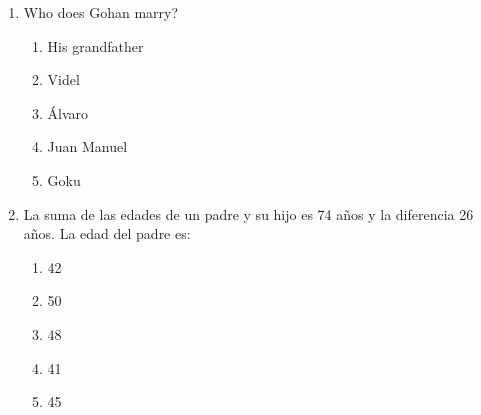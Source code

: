 \documentclass[letterpaper,addpoints,answers,twocolumn,10pt]{exam}
\begin{document}
\begin{enumerate}[leftmargin=.2in]
\begin{enumerate}[noitemsep,leftmargin=0in]
\end{enumerate}



\item  Who does Gohan marry?


\begin{enumerate}[noitemsep,leftmargin=0in]


\item  His grandfather
\item  Videl
\item  Álvaro
\item  Juan Manuel
\item  Goku


\end{enumerate}



\item  La suma de las edades de un padre y su hijo es 74 años y la diferencia 26 años. La edad del padre es:


\begin{enumerate}[noitemsep,leftmargin=0in]


\item  42
\item  50
\item  48
\item  41
\item  45


\end{enumerate}



\end{enumerate}
\end{document}
